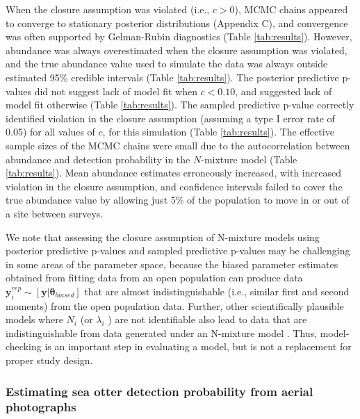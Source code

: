 \documentclass[12pt,english]{article}
\begin{document}
\begin{spacing}{1.9}
When the closure assumption was violated (i.e., $c>0$), MCMC
chains appeared to converge to stationary posterior distributions
(Appendix C), and convergence was often supported by Gelman-Rubin
diagnostics (Table \ref{tab:results}).  However, abundance was
always overestimated when the closure assumption was violated, and
the true abundance value used to simulate the data was always
outside estimated 95\% credible intervals (Table
\ref{tab:results}). The posterior predictive p-values did not
suggest lack of model fit when $c<0.10$, and suggested lack of
model fit otherwise (Table \ref{tab:results}). The sampled
predictive p-value correctly identified violation in the closure
assumption (assuming a type I error rate of 0.05) for all values
of $c$, for this simulation (Table \ref{tab:results}). The
effective sample sizes of the MCMC chains were small due to the
autocorrelation between abundance and detection probability in the
$N$-mixture model (Table \ref{tab:results}). Mean abundance
estimates erroneously increased, with increased violation in the
closure assumption, and confidence intervals failed to cover the
true abundance value by allowing just 5\% of the population to
move in or out of a site between surveys.

We note that assessing the closure assumption of N-mixture models using posterior predictive p-values and sampled predictive p-values may be challenging in some areas of the parameter space, because the biased parameter estimates obtained from fitting data from an open population can produce data $\textbf{y}_i^{rep}\sim [\textbf{y}|\boldsymbol{\theta}_{biased}]$ that are almost indistinguishable (i.e., similar first and second moments) from the open population data. Further, other scientifically plausible models where $N_i$ (or $\lambda_i$ ) are not identifiable also lead to data that are  indistinguishable from data generated under an N-mixture model \citep{BarkerEtAl2017}. Thus, model-checking is an important step in evaluating a model, but is not a replacement for proper study design.





\subsubsection*{Estimating sea otter detection probability from
  aerial photographs}


\end{spacing}
\end{document}
